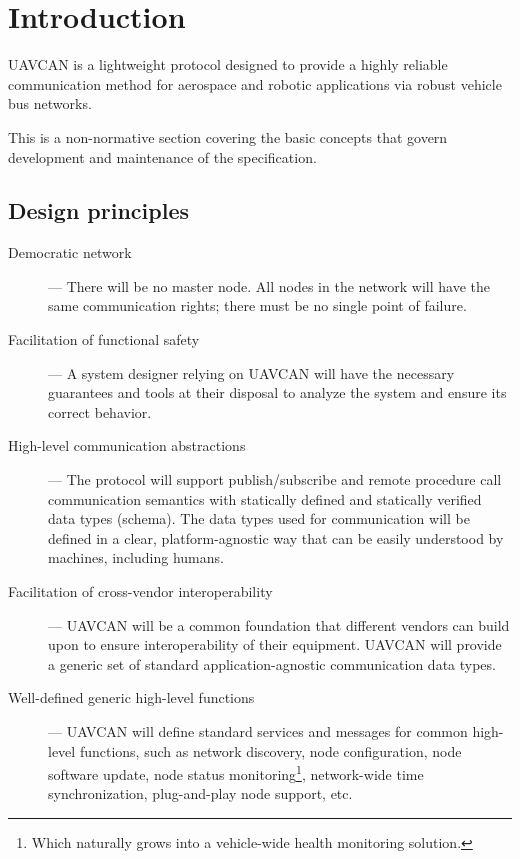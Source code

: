 \chapter{Introduction}\label{sec:introduction}

UAVCAN is a lightweight protocol designed to provide a highly reliable communication method for
aerospace and robotic applications via robust vehicle bus networks.

This is a non-normative section covering the basic concepts that govern development and maintenance of
the specification.

\section{Design principles}

\begin{description}
    \item[Democratic network] --- There will be no master node.
    All nodes in the network will have the same communication rights; there must be no single point of failure.

    \item[Facilitation of functional safety] --- A system designer relying on UAVCAN will have the necessary
    guarantees and tools at their disposal to analyze the system and ensure its correct behavior.

    \item[High-level communication abstractions] --- The protocol will support publish/subscribe and remote procedure
    call communication semantics with statically defined and statically verified data types (schema).
    The data types used for communication will be defined in a clear, platform-agnostic way
    that can be easily understood by machines, including humans.

    \item[Facilitation of cross-vendor interoperability] --- UAVCAN will be a common foundation that
    different vendors can build upon to ensure interoperability of their equipment.
    UAVCAN will provide a generic set of standard application-agnostic communication data types.

    \item[Well-defined generic high-level functions] --- UAVCAN will define standard services
    and messages for common high-level functions, such as network discovery, node configuration,
    node software update, node status monitoring\footnote{Which naturally grows into a vehicle-wide
    health monitoring solution.}, network-wide time synchronization, plug-and-play node support, etc.


\end{description}
